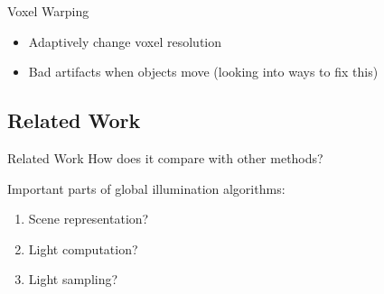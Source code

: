 \documentclass[10pt]{beamer}
\begin{document}
\begin{frame}{Voxel Warping}
  \begin{itemize}
    \item Adaptively change voxel resolution
    \item Bad artifacts when objects move (looking into ways to fix this) %
  \end{itemize}
\end{frame}

\subsection{Related Work}
\begin{frame}{Related Work}
  How does it compare with other methods?
  \vspace{1cm}

  Important parts of global illumination algorithms:
  \begin{enumerate}
    \item Scene representation? %
    \item Light computation? %
    \item Light sampling? %
  \end{enumerate}
\end{frame}

\end{document}
